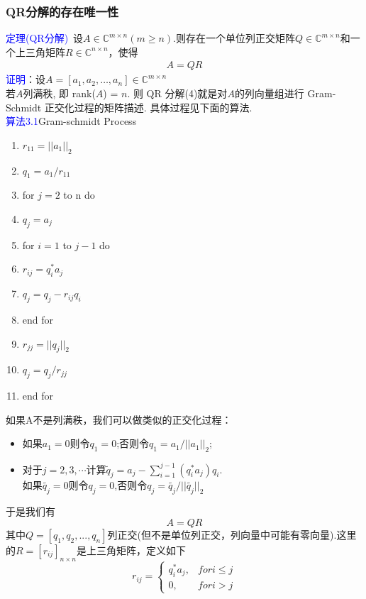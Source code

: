 \documentclass[12pt,a4paper]{article}
\begin{document}
\subsubsection {QR分解的存在唯一性}
\textcolor{blue}{定理(QR分解)}~设$A \in \mathbb{C}^{m \times n}(m \geq n)$.则存在一个单位列正交矩阵$Q \in \mathbb{C}^{m \times n}$和一个上三角矩阵$R \in \mathbb{C}^{n \times n}$，使得
\begin{eqnarray}
A=QR
\end{eqnarray}
\textcolor{blue}{证明}：设$A=\left[a_{1}, a_{2}, \ldots, a_{n}\right] \in \mathbb{C}^{m \times n}$\\
若$A$列满秩, 即 rank($A$) = $n$. 则 QR 分解(4)就是对$A$的列向量组进行
Gram-Schmidt 正交化过程的矩阵描述. 具体过程见下面的算法.\\
\textcolor{blue}{算法3.1}Gram-schmidt Process\\
\begin{enumerate}[1:]
	\item $r_{11}=||a_{1}||_{2}$
	\item $q_{1}=a_{1}/r_{11}$
	\item  for $j = 2$ to n do
	\item  \qquad $q_{j}=a_{j}$
	\item  \qquad for $i=1$ to $j-1$ do
	\item  \qquad \qquad $r_{ij}=q_{i}^{*}a_{j}$
	\item  \qquad \qquad $q_{j}=q_{j}-r_{ij}q_{i}$
	\item \qquad end for
	\item \qquad $r_{jj}=||q_{j}||_{2}$
	\item \qquad $q_{j}=q_{j}/r_{jj}$
	\item end for 
\end{enumerate}
如果A不是列满秩，我们可以做类似的正交化过程：
\begin{itemize}
	\item 如果$a_1=0$则令$q_1=0$;否则令$q_1=a_1/||a_1||_2$;
	\item 对于$j=2,3,\cdots$计算$\tilde{q}_{j}=a_j-\sum_{i=1}^{j-1}(q_i^*a_j)q_i$.\\
	如果$\tilde{q_j}=0$则令$q_j=0$,否则令$q_j=\tilde{q_j}/||\tilde{q_j}||_2$\\
\end{itemize}
于是我们有
\[
A=QR
\]
其中$Q=[q_1,q_2,...,q_n]$列正交(但不是单位列正交，列向量中可能有零向量).这里的$R=[r_{ij}]_{n\times n}$是上三角矩阵，定义如下
\[
r_{ij}=
\begin{cases}
q_{i}^{*} a_{j},&for i\leq j\\
0,&for i>j
\end{cases}
\]
\end{document}
